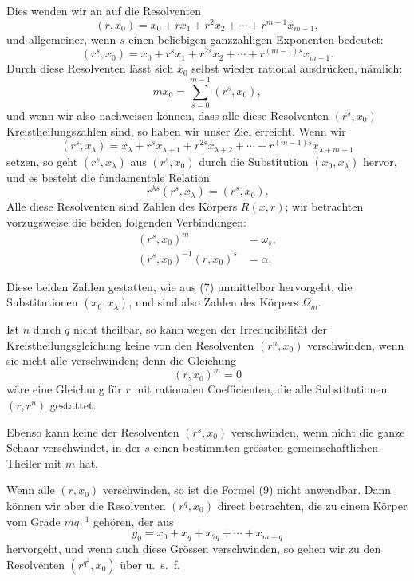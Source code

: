 \documentclass[11pt]{article}
\begin{document}
Dies wenden wir an auf die Resolventen
\begin{equation}
  (r,x_0)=x_0+rx_1+r^2x_2+\cdots+r^{m-1}x_{m-1},
\tag{3}
\end{equation}
und allgemeiner, wenn $s$ einen beliebigen ganzzahligen Exponenten bedeutet:
\begin{equation}
  (r^s,x_0)=x_0+r^s x_1+r^{2s}x_2+\cdots+r^{(m-1)s}x_{m-1}.
\tag{4}
\end{equation}
Durch diese Resolventen lässt sich $x_0$ selbst wieder rational ausdrücken, nämlich:
\begin{equation}
  mx_0=\sum_{s=0}^{m-1}(r^s,x_0),
\tag{5}
\end{equation}
und wenn wir also nachweisen können, dass alle diese Resolventen $(r^s,x_0)$ Kreistheilungszahlen sind, so haben wir unser Ziel erreicht. Wenn wir
\begin{equation}
  (r^s,x_\lambda)=x_\lambda+r^s x_{\lambda+1}+r^{2s}x_{\lambda+2}+\cdots+r^{(m-1)s}x_{\lambda+m-1}
\tag{6}
\end{equation}
setzen, so geht $(r^s,x_\lambda)$ aus $(r^s,x_0)$ durch die Substitution $(x_0,x_\lambda)$ hervor, und es besteht die fundamentale Relation
\begin{equation}
  r^{\lambda s}(r^s,x_\lambda)=(r^s,x_0).
\tag{7}
\end{equation}
Alle diese Resolventen sind Zahlen des Körpers $R(x,r)$; wir betrachten vorzugsweise die beiden folgenden Verbindungen:
\begin{align}
  (r^s,x_0)^m &= \omega_s, \tag{8}\\
  (r^s,x_0)^{-1}(r,x_0)^s &= \alpha. \tag{9}
\end{align}

Diese beiden Zahlen gestatten, wie aus (7) unmittelbar hervorgeht, die Substitutionen $(x_0,x_\lambda)$, und sind also Zahlen des Körpers $\Omega_m$.

Ist $n$ durch $q$ nicht theilbar, so kann wegen der Irreducibilität der Kreistheilungsgleichung keine von den Resolventen $(r^n,x_0)$ verschwinden, wenn sie nicht alle verschwinden; denn die Gleichung
\[
  (r,x_0)^m=0
\]
wäre eine Gleichung für $r$ mit rationalen Coefficienten, die alle Substitutionen $(r,r^n)$ gestattet.

Ebenso kann keine der Resolventen $(r^s,x_0)$ verschwinden, wenn nicht die ganze Schaar verschwindet, in der $s$ einen bestimmten grössten gemeinschaftlichen Theiler mit $m$ hat.

Wenn alle $(r,x_0)$ verschwinden, so ist die Formel (9) nicht anwendbar. Dann können wir aber die Resolventen $(r^q,x_0)$ direct betrachten, die zu einem Körper vom Grade $mq^{-1}$ gehören, der aus
\[
  y_0=x_0+x_q+x_{2q}+\cdots+x_{m-q}
\]
hervorgeht, und wenn auch diese Grössen verschwinden, so gehen wir zu den Resolventen $(r^{q^2},x_0)$ über u.~s.~f.
\end{document}
